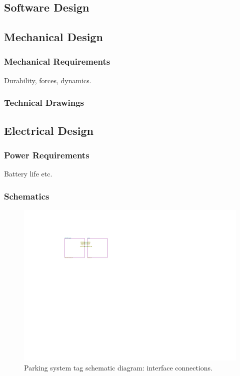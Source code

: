\subsection{Software Design}
\subsection{Mechanical Design} 
\subsubsection{Mechanical Requirements}
Durability, forces, dynamics.
\subsubsection{Technical Drawings}
\subsection{Electrical Design} 
\subsubsection{Power Requirements}
Battery life etc.
\subsubsection{Schematics}

\begin{figure}[H]
\begin{center}
\includegraphics[page=1,scale=2,trim={5cm 14cm 17cm 3cm},clip]{data/parking-system.pdf}
\caption{Parking system tag schematic diagram: interface connections.}
\end{center}
\end{figure}

